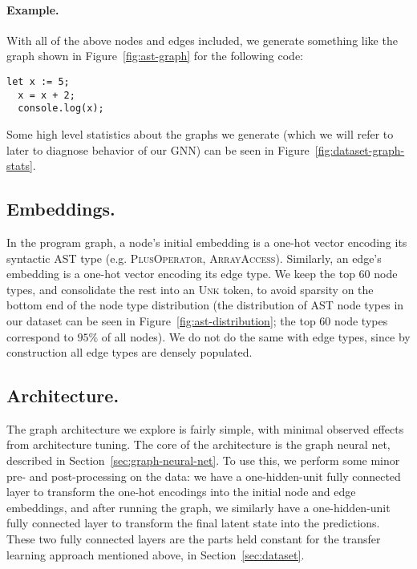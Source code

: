 \paragraph{Example.}
With all of the above nodes and edges included, we generate something like the graph shown in Figure~\ref{fig:ast-graph} for the following code:
\begin{lstlisting}[backgroundcolor = \color{white}, frame = single]
  let x := 5;
  x = x + 2;
  console.log(x);
\end{lstlisting}

Some high level statistics about the graphs we generate (which we will refer to later to diagnose behavior of our GNN) can be seen in Figure~\ref{fig:dataset-graph-stats}.

\subsection{Embeddings.}

In the program graph, a node's initial embedding is a one-hot vector encoding its syntactic AST type (e.g. \textsc{PlusOperator}, \textsc{ArrayAccess}).
Similarly, an edge's embedding is a one-hot vector encoding its edge type.
We keep the top 60 node types, and consolidate the rest into an \textsc{Unk} token, to avoid sparsity on the bottom end of the node type distribution (the distribution of AST node types in our dataset can be seen in Figure~\ref{fig:ast-distribution}; the top 60 node types correspond to $95\%$ of all nodes).
We do not do the same with edge types, since by construction all edge types are densely populated.


\subsection{Architecture.}

The graph architecture we explore is fairly simple, with minimal observed effects from architecture tuning.
The core of the architecture is the graph neural net, described in Section~\ref{sec:graph-neural-net}.
To use this, we perform some minor pre- and post-processing on the data: we have a one-hidden-unit fully connected layer to transform the one-hot encodings into the initial node and edge embeddings, and after running the graph, we similarly have a one-hidden-unit fully connected layer to transform the final latent state into the predictions.
These two fully connected layers are the parts held constant for the transfer learning approach mentioned above, in Section~\ref{sec:dataset}.

